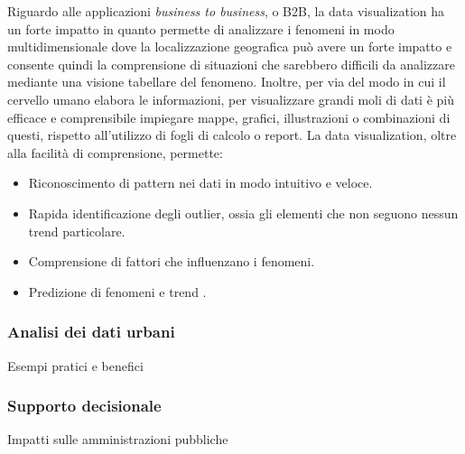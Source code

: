 Riguardo alle applicazioni \textit{business to business}, o B2B, la data visualization ha un forte impatto in quanto permette di analizzare i fenomeni in modo multidimensionale dove la localizzazione geografica può avere un forte impatto e consente quindi la comprensione di situazioni che sarebbero difficili da analizzare mediante una visione tabellare del fenomeno.
Inoltre, per via del modo in cui il cervello umano elabora le informazioni, per visualizzare grandi moli di dati è più efficace e comprensibile impiegare mappe, grafici, illustrazioni o combinazioni di questi, rispetto all'utilizzo di fogli di calcolo o report.
La data visualization, oltre alla facilità di comprensione, permette:
\begin{itemize}
    \item Riconoscimento di pattern nei dati in modo intuitivo e veloce.
    \item Rapida identificazione degli outlier, ossia gli elementi che non seguono nessun trend particolare.
    \item Comprensione di fattori che influenzano i fenomeni.
    \item Predizione di fenomeni e trend \cite{DataVisualization_Citta}.
\end{itemize}

\subsubsection{Analisi dei dati urbani}
Esempi pratici e benefici

\subsubsection{Supporto decisionale}
Impatti sulle amministrazioni pubbliche

